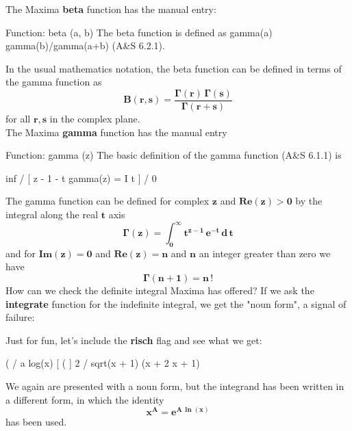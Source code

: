\documentclass[12pt]{article}
\begin{document}
\noindent The Maxima \textbf{beta} function has the manual entry:
\begin{myVerbatim2s}
Function: beta (a, b) 
The beta function is defined as gamma(a) gamma(b)/gamma(a+b) (A&S 6.2.1). 
\end{myVerbatim2s}
In the usual mathematics notation, the beta function can be defined in terms of the gamma function as
\begin{equation}
\mathbf{B(r,s) = \frac{\boldsymbol{\Gamma}(r)\,\boldsymbol{\Gamma}(s)}{\boldsymbol{\Gamma}(r + s)} }
\end{equation}
for all $\mathbf{r, s}$ in the complex plane.\\

\noindent The Maxima \textbf{gamma} function has the manual entry
\begin{myVerbatim2f}
Function: gamma (z) 
The basic definition of the gamma function (A&S 6.1.1) is 

                               inf
                              /
                              [     z - 1   - t
                   gamma(z) = I    t      %
                              ]
                              /
                               0
\end{myVerbatim2f}
The gamma function can be defined for complex $\mathbf{z}$ and $\mathbf{Re(z)  > 0}$ by the integral along
  the real $\mathbf{t}$ axis
\begin{equation}
\mathbf{\boldsymbol{\Gamma}(z) = \int_{0}^{\infty} t^{z-1}\,e^{-t}\,d\,t }
\end{equation}
and  for $\mathbf{Im(z) = 0}$ and $\mathbf{Re(z) = n}$ and $\mathbf{n}$ an integer greater than zero we have
\begin{equation}
\mathbf{\boldsymbol{\Gamma}(n+1) = n\,! }
\end{equation}
\newpage
\noindent How can we check the definite integral Maxima has offered?
If we ask the \textbf{integrate} function for the indefinite integral, we get 
   the "noun form", a signal of failure:
Just for fun, let's include the \textbf{risch} flag and see what we get:
\begin{myVerbatim1}
(%
                        /           a log(x)
                        [         %
(%
                        ]               2
                        / sqrt(x + 1) (x  + 2 x + 1)
\end{myVerbatim1} 
We again are presented with a noun form, but the integrand has been written in
  a different form, in which the identity
  $$\mathbf{x^A = e^{A \, \boldsymbol{\ln}(x)}}$$ has been used.\\  
\end{document}
